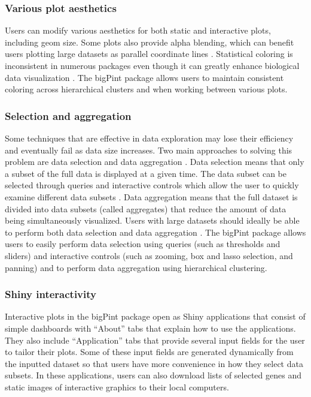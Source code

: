 \documentclass[parskip=full]{bmcart} %
\begin{document}
\subsubsection*{Various plot aesthetics}

Users can modify various aesthetics for both static and interactive plots, including geom size. Some plots also provide alpha blending, which can benefit users plotting large datasets as parallel coordinate lines \cite{unwin2007computational}. Statistical coloring is inconsistent in numerous packages even though it can greatly enhance biological data visualization \cite{yin2012ggbio}. The bigPint package allows users to maintain consistent coloring across hierarchical clusters and when working between various plots.

\subsubsection*{Selection and aggregation}

Some techniques that are effective in data exploration may lose their efficiency and eventually fail as data size increases. Two main approaches to solving this problem are data selection and data aggregation \cite{andrienko2005blending}. Data selection means that only a subset of the full data is displayed at a given time. The data subset can be selected through queries and interactive controls which allow the user to quickly examine different data subsets \cite{andrienko2005blending}. Data aggregation means that the full dataset is divided into data subsets (called aggregates) that reduce the amount of data being simultaneously visualized. Users with large datasets should ideally be able to perform both data selection and data aggregation \cite{andrienko2005blending}. The bigPint package allows users to easily perform data selection using queries (such as thresholds and sliders) and interactive controls (such as zooming, box and lasso selection, and panning) and to perform data aggregation using hierarchical clustering. 

\subsubsection*{Shiny interactivity}

Interactive plots in the bigPint package open as Shiny applications that consist of simple dashboards with ``About'' tabs that explain how to use the applications. They also include ``Application'' tabs that provide several input fields for the user to tailor their plots. Some of these input fields are generated dynamically from the inputted dataset so that users have more convenience in how they select data subsets. In these applications, users can also download lists of selected genes and static images of interactive graphics to their local computers. 
\end{document}
